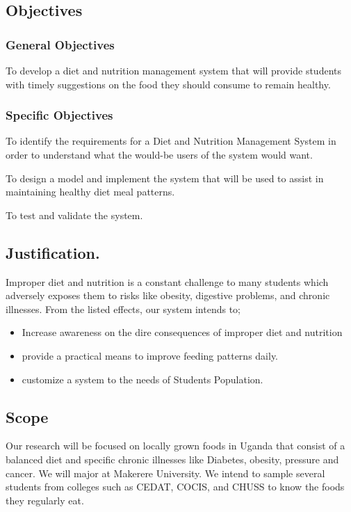 \documentclass{article}
\begin{document}
\subsection{Objectives}
\subsubsection{General Objectives}

To develop a diet and nutrition management system that will provide students with timely suggestions on the food they should consume to remain healthy. 

\subsubsection{Specific Objectives}

To identify the requirements for a Diet and Nutrition Management System in order to understand what the would-be users of the system would want.

To design a model and implement the system that will be used to assist in maintaining healthy diet meal patterns.

To test and validate the system.  

\subsection{Justification.}
Improper diet and nutrition is a constant challenge to many students which adversely exposes them to risks like obesity, digestive problems, and chronic illnesses. From the listed effects, our system intends to; 
\begin{itemize}
  \item Increase awareness on the dire consequences of improper diet and nutrition
  \item provide a practical means to improve feeding patterns daily. 
  \item customize a system to the needs of Students Population. 

\end{itemize}

\subsection{Scope}
Our research will be focused on locally grown foods in Uganda that consist of a balanced diet and specific chronic illnesses like Diabetes, obesity, pressure and cancer. We will major at Makerere University. We intend to sample several students from colleges such as CEDAT, COCIS, and CHUSS to know the foods they regularly eat.
\end{document}
